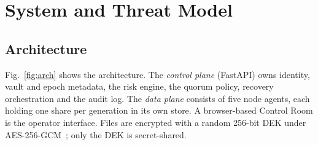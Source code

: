 \documentclass[conference]{IEEEtran}
\begin{document}
\section{System and Threat Model}
\label{sec:model}

\subsection{Architecture}
Fig.~\ref{fig:arch} shows the architecture. The \emph{control plane} (FastAPI) owns identity, vault and epoch metadata, the risk engine, the quorum policy, recovery orchestration and the audit log. The \emph{data plane} consists of five node agents, each holding one share per generation in its own store. A browser-based Control Room is the operator interface. Files are encrypted with a random 256-bit DEK under AES-256-GCM~\cite{dworkin2007gcm}; only the DEK is secret-shared.
\end{document}
